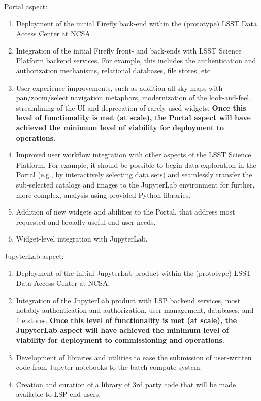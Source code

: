 \documentclass[DM,lsstdraft,toc]{lsstdoc}
\begin{document}
Portal aspect:
\begin{enumerate}
	\item Deployment of the initial Firefly back-end within the (prototype) LSST Data Access Center at NCSA.
	\item Integration of the initial Firefly front- and back-ends with LSST Science Platform backend services. For example, this includes the authentication and authorization mechanisms, relational databases, file stores, etc.
	\item User experience improvements, such as addition all-sky maps with pan/zoom/select navigation metaphors, modernization of the look-and-feel, streamlining of the UI and deprecation of rarely used widgets. {\bf Once this level of functionality is met (at scale), the Portal aspect will have achieved the minimum level of viability for deployment to operations}.
	\item Improved user workflow integration with other aspects of the LSST Science Platform. For example, it should be possible to begin data exploration in the Portal (e.g., by interactively selecting data sets) and seamlessly transfer the sub-selected catalogs and images to the JupyterLab environment for further, more complex, analysis using provided Python libraries.
	\item Addition of new widgets and abilities to the Portal, that address most requested and broadly useful end-user needs.
	\item Widget-level integration with JupyterLab.
\end{enumerate}

JupyterLab aspect:
\begin{enumerate}
	\item Deployment of the initial JupyterLab product within the (prototype) LSST Data Access Center at NCSA.
	\item Integration of the JupyterLab product with LSP backend services, most notably authentication and authorization, user management, databases, and file stores. {\bf Once this level of functionality is met (at scale), the JupyterLab aspect will have achieved the minimum level of viability for deployment to commissioning and operations}.
	\item Development of libraries and utilities to ease the submission of user-written code from Jupyter notebooks to the batch compute system.
	\item Creation and curation of a library of 3rd party code that will be made available to LSP end-users.
\end{enumerate}
\end{document}
